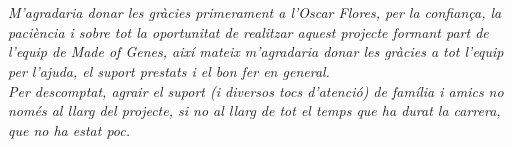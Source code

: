 \chapter*{}
\noindent\textit{M'agradaria donar les gràcies primerament a l'Oscar Flores, per la confiança, la paciència i sobre tot la oportunitat de realitzar aquest projecte formant part de l'equip de Made of Genes, així mateix m'agradaria donar les gràcies a tot l'equip per l'ajuda, el suport prestats i el bon fer en general.\\
\newline Per descomptat, agrair el suport (i diversos tocs d'atenció) de família i amics no només al llarg del projecte, si no al llarg de tot el temps que ha durat la carrera, que no ha estat poc.}
\clearpage